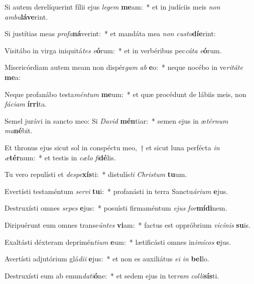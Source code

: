 \item Si autem derelíquerint fílii ejus \textit{le}\textit{gem} \textbf{me}am:~* et in judíciis meis \textit{non} \textit{am}\textit{bu}\textbf{lá}\textbf{ve}rint.
\item Si justítias meas \textit{pro}\textit{fa}\textbf{ná}verint:~* et mandáta mea \textit{non} \textit{cus}\textit{to}\textbf{dí}\textbf{e}rint:
\item Visitábo in virga iniquitá\textit{tes} \textit{e}\textbf{ó}rum:~* et in verbéribus pec\textit{cá}\textit{ta} \textit{e}\textbf{ó}rum.
\item Misericórdiam autem meam non dispér\textit{gam} \textit{ab} \textbf{e}o:~* neque nocébo in ve\textit{ri}\textit{tá}\textit{te} \textbf{me}a:
\item Neque profanábo testa\textit{mén}\textit{tum} \textbf{me}um:~* et quæ procédunt de lábiis meis, non \textit{fá}\textit{ci}\textit{am} \textbf{ír}\textbf{ri}ta.
\item Semel jurávi in sancto meo: Si \textit{Da}\textit{vid} \textbf{mén}tiar:~* semen ejus in æ\textit{tér}\textit{num} \textit{ma}\textbf{né}bit.
\item Et thronus ejus sicut sol in conspéctu meo,~† et sicut luna perfécta \textit{in} \textit{æ}\textbf{tér}num:~* et testis in \textit{cæ}\textit{lo} \textit{fi}\textbf{dé}lis.
\item Tu vero repulísti et \textit{de}\textit{spe}\textbf{xís}ti:~* distulís\textit{ti} \textit{Chris}\textit{tum} \textbf{tu}um.
\item Evertísti testaméntum \textit{ser}\textit{vi} \textbf{tu}i:~* profanásti in terra Sanctu\textit{á}\textit{ri}\textit{um} \textbf{e}jus.
\item Destruxísti omnes \textit{se}\textit{pes} \textbf{e}jus:~* posuísti firmaméntum \textit{e}\textit{jus} \textit{for}\textbf{mí}\textbf{di}nem.
\item Diripuérunt eum omnes transe\textit{ún}\textit{tes} \textbf{vi}am:~* factus est oppróbrium \textit{vi}\textit{cí}\textit{nis} \textbf{su}is.
\item Exaltásti déxteram deprimén\textit{ti}\textit{um} \textbf{e}um:~* lætificásti omnes in\textit{i}\textit{mí}\textit{cos} \textbf{e}jus.
\item Avertísti adjutórium glá\textit{di}\textit{i} \textbf{e}jus:~* et non es auxiliátus \textit{e}\textit{i} \textit{in} \textbf{bel}lo.
\item Destruxísti eum ab emun\textit{da}\textit{ti}\textbf{ó}ne:~* et sedem ejus in ter\textit{ram} \textit{col}\textit{li}\textbf{sís}ti.
